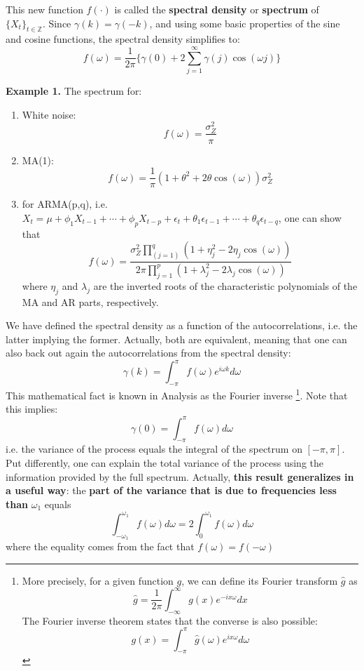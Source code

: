 This new function $f(\cdot)$ is called the \textbf{spectral density} or \textbf{spectrum} of $\{X_t\}_{t\in \mathbb{Z}}$. Since $\gamma(k)=\gamma(-k)$, and using some basic properties of the sine and cosine functions, the spectral density simplifies to: \[
f(\omega)=\frac{1}{2\pi}\{\gamma(0) + 2\sum_{j=1}^\infty \gamma(j) \cos(\omega j)\}
\]

\textbf{Example 1.} The spectrum for:
\begin{enumerate}
    \item White noise: \[
    f(\omega) = \frac{\sigma_Z^2}{\pi}
    \]
    \item MA(1): \[
    f(\omega)=\frac{1}{\pi}(1+\theta^2+2\theta\cos(\omega))\sigma_Z^2
    \]
    \item for ARMA(p,q), i.e. $X_t=\mu+\phi_1 X_{t-1}+\cdots+\phi_p X_{t-p} + \epsilon_t + \theta_1 \epsilon_{t-1} + \cdots +\theta_q \epsilon_{t-q} $, one can show that \[
    f(\omega)=\frac{\sigma_Z^2 \prod_(j=1)^q(1+\eta_j^2-2\eta_j \cos(\omega)) }{2\pi \prod_{j=1}^p(1+\lambda_j^2-2\lambda_j\cos(\omega)) }
    \] where $\eta_j$ and $\lambda_j$ are the inverted roots of the characteristic polynomials of the MA and AR parts, respectively.
\end{enumerate}

We have defined the spectral density as a function of the autocorrelations, i.e. the latter implying the former. Actually, both are equivalent, meaning that one can also back out again the autocorrelations from the spectral density: \[
\gamma(k)=\int_{-\pi}^\pi f(\omega) e^{i\omega k} d\omega
\]
This mathematical fact is known in Analysis as the Fourier inverse \footnote{More precisely, for a given function $g$, we can define its Fourier transform $\hat{g}$ as \[
\hat{g}=\frac{1}{2\pi} \int_{-\infty}^\infty g(x)e^{-ix\omega} dx
\] The Fourier inverse theorem states that the converse is also possible: \[
g(x) = \int_{-\pi}^\pi \hat{g}(\omega)e^{ix\omega}d\omega
\]
}. Note that this implies:\[
\gamma(0) = \int_{-\pi}^\pi f(\omega) d\omega
\]
i.e. the variance of the process equals the integral of the spectrum on $[-\pi,\pi]$. Put differently, one can explain the total variance of the process using the information provided by the full spectrum. Actually, \textbf{this result generalizes in a useful way}: the \textbf{part of the variance that is due to frequencies less than} $\omega_1$ equals \[
\int_{-\omega_1}^{\omega_1}f(\omega)d\omega=2\int_0^{\omega_1} f(\omega)d\omega \label{SP2}
\] where the equality comes from the fact that $f(\omega)=f(-\omega)$

